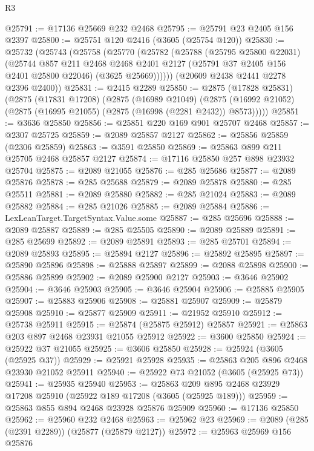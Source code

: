 \begin{lexlean}{R3}
\begin{coremodule}
@25791 := @17136 @25669 @232 @2468
@25795 := @25791 @23 @2405 @156 @2397
@25800 := @25751 @120 @2416 (@3605 (@25754 @120))
@25830 := @25732
    (@25743
      (@25758
        (@25770
          (@25782
            (@25788
              (@25795 @25800 @22031)
              (@25744
                @857
                @211
                @2468
                @2468
                @2401
                @2127
                (@25791 @37 @2405 @156 @2401 @25800 @22046)
                (@3625 @25669))))))
      (@20609 @2438 @2441 @2278 @2396 @2400))
@25831 := @2415 @2289
@25850 := @2875
    (@17828 @25831)
    (@2875
      (@17831 @17208)
      (@2875
        (@16989 @21049)
        (@2875 (@16992 @21052) (@2875 (@16995 @21055) (@2875 (@16998 (@2281 @2432)) @8573)))))
@25851 := @3636 @25850
@25856 := @25851 @220 @169 @901 @25707 @2468
@25857 := @2307 @25725
@25859 := @2089 @25857 @2127
@25862 := @25856 @25859 (@2306 @25859)
@25863 := @3591 @25850
@25869 := @25863 @899 @211 @25705 @2468 @25857 @2127
@25874 := @17116 @25850 @257 @898 @23932 @25704
@25875 := @2089 @21055
@25876 := @285 @25686
@25877 := @2089 @25876
@25878 := @285 @25688
@25879 := @2089 @25878
@25880 := @285 @25511
@25881 := @2089 @25880
@25882 := @285 @21024
@25883 := @2089 @25882
@25884 := @285 @21026
@25885 := @2089 @25884
@25886 := LexLeanTarget.TargetSyntax.Value.some
@25887 := @285 @25696
@25888 := @2089 @25887
@25889 := @285 @25505
@25890 := @2089 @25889
@25891 := @285 @25699
@25892 := @2089 @25891
@25893 := @285 @25701
@25894 := @2089 @25893
@25895 := @25894 @2127
@25896 := @25892 @25895
@25897 := @25890 @25896
@25898 := @25888 @25897
@25899 := @2088 @25898
@25900 := @25886 @25899
@25902 := @2089 @25900 @2127
@25903 := @3646 @25902
@25904 := @3646 @25903
@25905 := @3646 @25904
@25906 := @25885 @25905
@25907 := @25883 @25906
@25908 := @25881 @25907
@25909 := @25879 @25908
@25910 := @25877 @25909
@25911 := @21952 @25910
@25912 := @25738 @25911
@25915 := @25874 (@25875 @25912) @25857
@25921 := @25863 @203 @897 @2468 @23931 @21055 @25912
@25922 := @3600 @25850
@25924 := @25922 @37 @21055
@25925 := @3606 @25850
@25928 := @25924 (@3605 (@25925 @37))
@25929 := @25921 @25928
@25935 := @25863 @205 @896 @2468 @23930 @21052 @25911
@25940 := @25922 @73 @21052 (@3605 (@25925 @73))
@25941 := @25935 @25940
@25953 := @25863 @209 @895 @2468 @23929 @17208 @25910 (@25922 @189 @17208 (@3605 (@25925 @189)))
@25959 := @25863 @855 @894 @2468 @23928 @25876 @25909
@25960 := @17136 @25850
@25962 := @25960 @232 @2468
@25963 := @25962 @23
@25969 := @2089 (@285 (@2391 @2289)) (@25877 (@25879 @2127))
@25972 := @25963 @25969 @156 @25876

\end{coremodule}
\end{lexlean}
